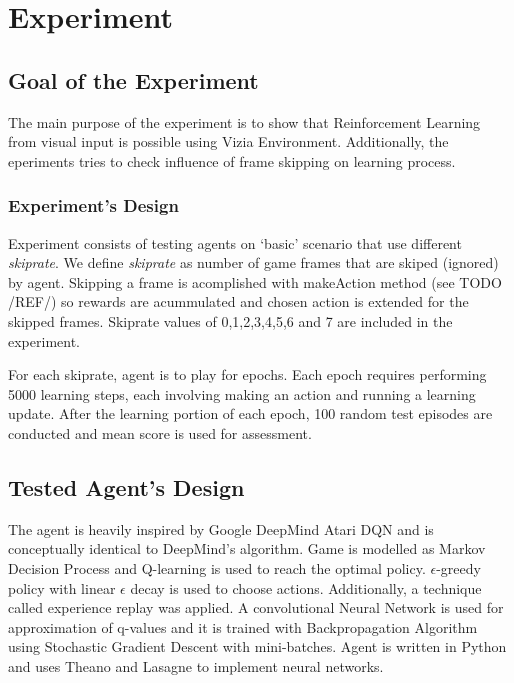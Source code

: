 \chapter{Experiment}

\section{Goal of the Experiment}
The main purpose of the experiment is to show that Reinforcement Learning from visual input is possible using Vizia Environment. 	
Additionally, the eperiments tries to check influence of frame skipping on learning process.

\subsection{Experiment's Design}
Experiment consists of testing agents on `basic' scenario that use different \emph{skiprate}. We define \emph{skiprate} as number of game frames that are skiped (ignored) by agent. Skipping a frame is acomplished with makeAction method  (see TODO /REF/) so rewards are acummulated and chosen action is extended for the skipped frames. Skiprate values of 0,1,2,3,4,5,6 and 7 are included in the experiment. 

For each skiprate, agent is to play for epochs. Each epoch requires performing 5000 learning steps, each involving making an action and running a learning update. After the learning portion of each epoch, 100 random test episodes are conducted and mean score is used for assessment.  

\section{Tested Agent's Design}
	The agent is heavily inspired by Google DeepMind Atari DQN \cite{mnih-dqn-2015}\cite{mnih-atari-2013} and is conceptually identical to DeepMind's algorithm. Game is modelled as Markov Decision Process and Q-learning\cite{watkins:mlj92} is used to reach the optimal policy. $\epsilon$-greedy policy with linear $\epsilon$ decay is used to choose actions. Additionally, a technique called experience replay\cite{mnih-dqn-2015} was applied. A convolutional Neural Network is used for approximation of q-values and it is trained with Backpropagation Algorithm\cite{lecun-98b} using Stochastic Gradient Descent with mini-batches. Agent is written in Python and uses Theano\cite{Bastien-Theano-2012}\cite{bergstra+al:2010-scipy} and Lasagne\cite{sander_dieleman_2015_27878} to implement neural networks.

